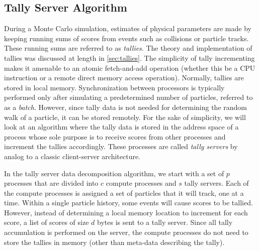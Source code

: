 \subsection{Tally Server Algorithm}
\label{sec:tally-server-algorithm}

During a Monte Carlo simulation, estimates of physical parameters are made by
keeping running sums of scores from events such as collisions or particle
tracks. These running sums are referred to as \emph{tallies}. The theory and
implementation of tallies was discussed at length in \autoref{sec:tallies}. The
simplicity of tally incrementing makes it amenable to an atomic fetch-and-add
operation (whether this be a CPU instruction or a remote direct memory access
operation). Normally, tallies are stored in local memory. Synchronization
between processors is typically performed only after simulating a predetermined
number of particles, referred to as a \emph{batch}. However, since tally data is
not needed for determining the random walk of a particle, it can be stored
remotely. For the sake of simplicity, we will look at an algorithm where the
tally data is stored in the address space of a process whose sole purpose is to
receive scores from other processes and increment the tallies accordingly. These
processes are called \emph{tally servers} by analog to a classic client-server
architecture.

In the tally server data decomposition algorithm, we start with a set of $p$
processes that are divided into $c$ compute processes and $s$ tally
servers. Each of the compute processes is assigned a set of particles that it
will track, one at a time. Within a single particle history, some events will
cause scores to be tallied. However, instead of determining a local memory
location to increment for each score, a list of scores of size $d$ bytes is sent
to a tally server. Since all tally accumulation is performed on the server, the
compute processes do not need to store the tallies in memory (other than
meta-data describing the tally).

